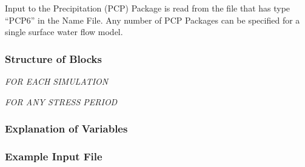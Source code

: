 Input to the Precipitation (PCP) Package is read from the file that has type ``PCP6'' in the Name File.  Any number of PCP Packages can be specified for a single surface water flow model.

\vspace{5mm}
\subsubsection{Structure of Blocks}
\vspace{5mm}

\noindent \textit{FOR EACH SIMULATION}


\vspace{5mm}
\noindent \textit{FOR ANY STRESS PERIOD}

\packageperioddescription

\vspace{5mm}
\subsubsection{Explanation of Variables}
\begin{description}

\end{description}

\vspace{5mm}
\subsubsection{Example Input File}



